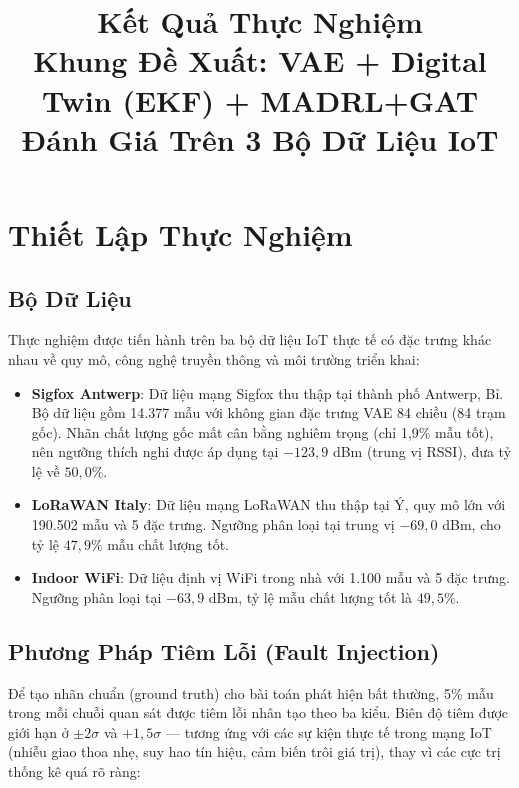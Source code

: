 \documentclass[12pt,a4paper]{article}
\title{\textbf{Kết Quả Thực Nghiệm}\\
\large Khung Đề Xuất: VAE + Digital Twin (EKF) + MADRL+GAT\\
Đánh Giá Trên 3 Bộ Dữ Liệu IoT}
\author{}
\date{}
\begin{document}
\maketitle
\tableofcontents
\newpage

\section{Thiết Lập Thực Nghiệm}

\subsection{Bộ Dữ Liệu}

Thực nghiệm được tiến hành trên ba bộ dữ liệu IoT thực tế có đặc trưng khác nhau
về quy mô, công nghệ truyền thông và môi trường triển khai:

\begin{itemize}
    \item \textbf{Sigfox Antwerp}: Dữ liệu mạng Sigfox thu thập tại thành phố Antwerp,
    Bỉ. Bộ dữ liệu gồm 14.377 mẫu với không gian đặc trưng VAE 84 chiều (84 trạm
    gốc). Nhãn chất lượng gốc mất cân bằng nghiêm trọng (chỉ 1,9\% mẫu tốt),
    nên ngưỡng thích nghi được áp dụng tại $-123{,}9$ dBm (trung vị RSSI),
    đưa tỷ lệ về $50{,}0\%$.

    \item \textbf{LoRaWAN Italy}: Dữ liệu mạng LoRaWAN thu thập tại Ý, quy mô lớn
    với 190.502 mẫu và 5 đặc trưng. Ngưỡng phân loại tại trung vị
    $-69{,}0$ dBm, cho tỷ lệ $47{,}9\%$ mẫu chất lượng tốt.

    \item \textbf{Indoor WiFi}: Dữ liệu định vị WiFi trong nhà với 1.100 mẫu
    và 5 đặc trưng. Ngưỡng phân loại tại $-63{,}9$ dBm,
    tỷ lệ mẫu chất lượng tốt là $49{,}5\%$.
\end{itemize}

\subsection{Phương Pháp Tiêm Lỗi (Fault Injection)}

Để tạo nhãn chuẩn (ground truth) cho bài toán phát hiện bất thường, 5\% mẫu
trong mỗi chuỗi quan sát được tiêm lỗi nhân tạo theo ba kiểu. Biên độ tiêm
được giới hạn ở $\pm 2\sigma$ và $+1{,}5\sigma$ — tương ứng với các sự kiện
thực tế trong mạng IoT (nhiễu giao thoa nhẹ, suy hao tín hiệu, cảm biến
trôi giá trị), thay vì các cực trị thống kê quá rõ ràng:
\end{document}
